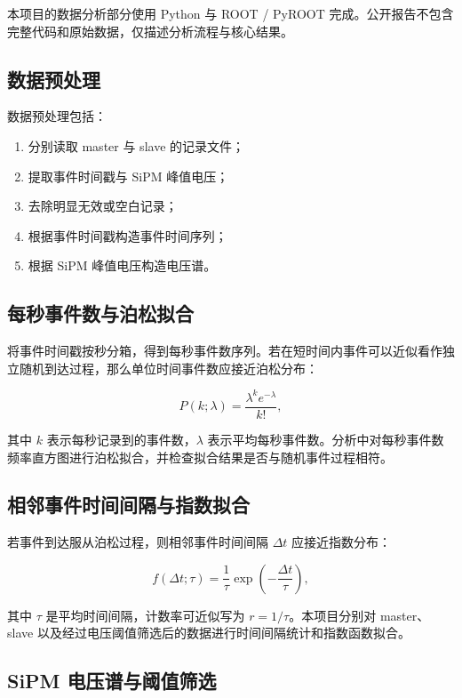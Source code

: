 \documentclass[11pt,a4paper]{ctexart}
\begin{document}
本项目的数据分析部分使用 Python 与 ROOT / PyROOT 完成。公开报告不包含完整代码和原始数据，仅描述分析流程与核心结果。

\subsection{数据预处理}

数据预处理包括：

\begin{enumerate}
  \item 分别读取 master 与 slave 的记录文件；
  \item 提取事件时间戳与 SiPM 峰值电压；
  \item 去除明显无效或空白记录；
  \item 根据事件时间戳构造事件时间序列；
  \item 根据 SiPM 峰值电压构造电压谱。
\end{enumerate}

\subsection{每秒事件数与泊松拟合}

将事件时间戳按秒分箱，得到每秒事件数序列。若在短时间内事件可以近似看作独立随机到达过程，那么单位时间事件数应接近泊松分布：

\begin{equation}
P(k;\lambda)=\frac{\lambda^k e^{-\lambda}}{k!},
\end{equation}

其中 $k$ 表示每秒记录到的事件数，$\lambda$ 表示平均每秒事件数。分析中对每秒事件数频率直方图进行泊松拟合，并检查拟合结果是否与随机事件过程相符。

\subsection{相邻事件时间间隔与指数拟合}

若事件到达服从泊松过程，则相邻事件时间间隔 $\Delta t$ 应接近指数分布：

\begin{equation}
f(\Delta t;\tau)=\frac{1}{\tau}\exp\left(-\frac{\Delta t}{\tau}\right),
\end{equation}

其中 $\tau$ 是平均时间间隔，计数率可近似写为 $r=1/\tau$。本项目分别对 master、slave 以及经过电压阈值筛选后的数据进行时间间隔统计和指数函数拟合。

\subsection{SiPM 电压谱与阈值筛选}
\end{document}
